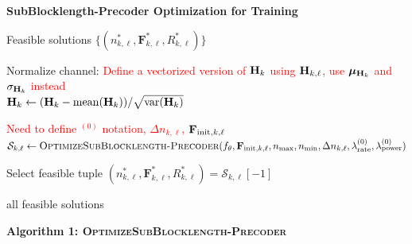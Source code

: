 \documentclass[a4paper, 12pt, onecolumn, journal, twoside, draftclsnofoot]{IEEEtran}
\begin{document}
\noindent\textbf{SubBlocklength-Precoder Optimization for Training }

\begin{algorithmic}[1]
\Ensure
Feasible solutions
$\{(n_{k,\ell}^*, \mathbf{F}_{k,\ell}^*, R_{k,\ell}^*)\}$

 

    \State Normalize channel:
    \textcolor{red}{Define a vectorized version of ${\bf H}_k$ using ${\bf H}_{k,\ell}$, use ${\boldsymbol \mu}_{{\bf H}_k}$ and $\sigma_{{\bf H}_k}$ instead} \\
    ${\bf H}_k \gets ({\bf H}_k - \mathrm{mean}({\bf H}_k)) / \sqrt{\mathrm{var}({\bf H}_k)}$

     
	
		
        \State
        \textcolor{red}{Need to define $^{(0)}$ notation, $\Delta n_{k,\ell}$, ${\bf F}_{\text{init},k,\ell}$ } \\
        $\mathcal{S}_{k,\ell}
        \gets
        \textsc{OptimizeSubBlocklength-Precoder}
        (f_\theta,
        \mathbf{F}_{\mathrm{init}, k, \ell},
        n_{\max},
        n_{\min},
        \Delta n_{k,\ell},
        \lambda_\text{rate}^{(0)},
        \lambda_\text{power}^{(0)})$

        \State Select feasible tuple
        $(n_{k,\ell}^*, \mathbf{F}_{k,\ell}^*, R_{k,\ell}^*)
        = \mathcal{S}_{k,\ell}[-1]$

    \EndFor
\EndFor

\State \Return all feasible solutions
\end{algorithmic}


\newpage


\noindent\textbf{Algorithm 1: \textsc{OptimizeSubBlocklength-Precoder}}
\end{document}
